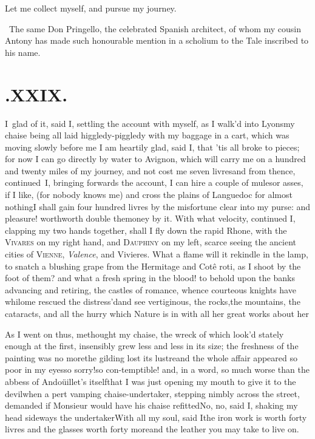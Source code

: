 \documentclass{article}
\begin{document}
\tsh Let me collect myself, and pursue my journey.

\bigskip
\bgroup\footnotesize
\indent\fnast\ The same Don Pringello, the
celebrated Spanish architect, of whom my cousin Antony has\break
made such honourable mention in a scholium to\break
the Tale inscribed to his name.\\\par
\egroup

\vfill{}\eject
\section{.\enspace XXIX.}

\lettrine{I}{\,}
glad of it, said I, settling the account with myself, as I
walk’d into Lyons\tsh my chaise being all laid higgledy-piggledy
with my baggage in a cart, which was moving slowly before me\tsh
I am heartily glad, said I, that ’tis all broke to pieces; for
now I can go directly by water to Avignon, which will carry me
on a hundred and twenty miles of my journey, and not cost me
seven livres\tsh and from thence, continued~I, bringing forwards
the account, I can hire a couple of mules\tsk or asses, if I
like, (for nobody knows me) and cross the plains of Languedoc
for almost nothing\tsh I shall gain four hundred livres by the
misfortune clear into my purse: and pleasure! worth\tsk worth
double the\break money by it. With what velocity, continued I,
clapping my two hands toge\-ther, shall I fly down the rapid
Rhone, with the \textsc{Vivares} on my right hand, and
\textsc{Dauphiny} on my left, scarce seeing the ancient cities
of \textsc{Vienne}, \textit{Valence}, and Vivieres. What a flame
will it rekindle in the lamp, to snatch a blushing grape from
the Hermitage and Cotê roti, as I shoot by the foot of them? and
what a fresh spring in the blood!  to behold upon the banks
advancing and retiring, the castles of romance, whence courteous
knights have whilome rescued the distress’d\tsh and see
vertiginous, the rocks,\break the mountains, the cataracts, and all
the hurry which Nature is in with all her great works about
her\tsh{}

As I went on thus, methought my chaise, the wreck of which look’d stately
enough at the first, insensibly grew less and less in its size; the freshness
of the painting was no more\tsk the gilding lost its lustre\tsk and the
whole affair appeared so poor in my eyes\tsk so sorry!\tsk so
con-\break temptible!
and, in a word, so much worse than the abbess of Andoüillet’s
itself\tsk that I was just opening my mouth to give it to the
devil\tsk when a pert vamping chaise-undertaker, stepping nimbly across the
street, demanded if Monsieur would have his chaise refitted\tsk No,
no, said I, shaking my head sideways\tsk{}
the undertaker\tsk With all my soul, said\break
I\tsk the iron work is worth forty livres\tsk\break
and the glasses worth forty more\tsk and the leather
you may take to live on.
\end{document}
